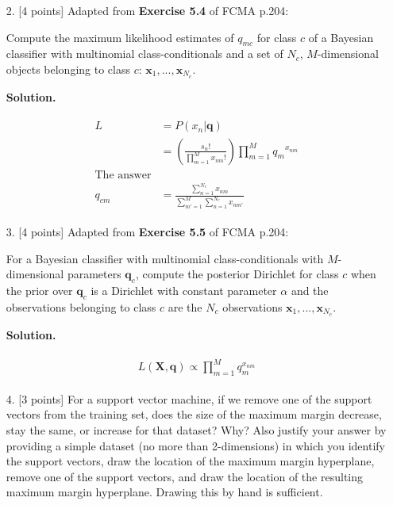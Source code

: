 \documentclass[10pt]{article}
\begin{document}
\begin{itemize}
\item[2.]  [4 points]
Adapted from {\bf Exercise 5.4} of FCMA p.204:

Compute the maximum likelihood estimates of $q_{mc}$ for class $c$ of a Bayesian classifier with multinomial class-conditionals and a set of $N_c$, $M$-dimensional objects belonging to class $c$: $\mathbf{x}_1, ..., \mathbf{x}_{N_c}$.

{\bf Solution.} %

\begin{eqnarray*}
\begin{aligned}
L &= P(x_n | \mathbf{q})
\\
&= \left( \frac{s_n !}{\prod_{m=1}^M x_{nm} !} \right)
\prod_{m=1}^M {q_m}^{x_{nm}}
\\
\text{The answer}
\\
q_{cm} &= \frac{ \sum_{n=1}^{N_c} x_{nm} } { \sum_{m'=1}^M \sum_{n=1}^{N_c} x_{nm'} }
\end{aligned}
\end{eqnarray*}


\item[3.]  [4 points]  
Adapted from {\bf Exercise 5.5} of FCMA p.204:

For a Bayesian classifier with multinomial class-conditionals with $M$-dimensional parameters $\mathbf{q}_c$, compute the posterior Dirichlet for class $c$ when the prior over $\mathbf{q}_c$ is a Dirichlet with constant parameter $\alpha$ and the observations belonging to class $c$ are the $N_c$ observations $\mathbf{x}_1, ..., \mathbf{x}_{N_c}$.

{\bf Solution.} %

\begin{eqnarray*}
\begin{aligned}
L(\mathbf{X}, \mathbf{q}) \propto \prod_{m=1}^M q_m^{x_{nm}}
\end{aligned}
\end{eqnarray*}

\item[4.]  [3 points]
For a support vector machine, if we remove one of the support vectors from the training set, does the size of the maximum margin decrease, stay the same, or increase for that dataset?  Why?  Also justify your answer by providing a simple dataset (no more than 2-dimensions) in which you identify the support vectors, draw the location of the maximum margin hyperplane, remove one of the support vectors, and draw the location of the resulting maximum margin hyperplane.  Drawing this by hand is sufficient.


\end{itemize}
\end{document}
